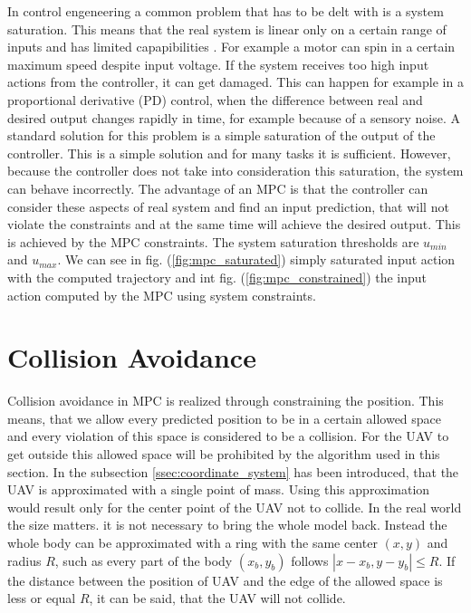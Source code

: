 \documentclass[a4paper,11pt,titlepage]{article}
\begin{document}
In control engeneering a common problem that has to be delt with is a system saturation. This means that the real system is linear only on a certain range of inputs and has limited capapibilities \cite{saturation}. For example a motor can spin in a certain maximum speed despite input voltage. If the system receives too high input actions from the controller, it can get damaged. This can happen for example in a proportional derivative (PD) control, when the difference between real and desired output changes rapidly in time, for example because of a sensory noise.
A standard  solution for this problem is a simple saturation of the output of the controller. This is a simple solution and for many tasks it is sufficient. However, because the controller does not take into consideration this saturation, the system can behave incorrectly.
The advantage of an MPC is that the controller can consider these aspects of real system and find an input prediction, that will not violate the constraints and at the same time will achieve the desired output. This is achieved by the MPC constraints. The system saturation thresholds are $u_{min}$ and $u_{max}$. We can see in fig. (\ref{fig:mpc_saturated}) simply saturated input action with the computed trajectory and int fig. (\ref{fig:mpc_constrained}) the input action computed by the MPC using system constraints. 

\section{Collision Avoidance}
Collision avoidance in MPC is realized through constraining the position. This means, that we allow every predicted position to be in a certain allowed space and every violation of this space is considered to be a collision. For the UAV to get outside this allowed space will be prohibited by the algorithm used in this section. In the subsection \ref{ssec:coordinate_system} has been introduced, that the UAV is approximated with a single point of mass. Using this approximation would result only for the center point of the UAV not to collide. In the real world the size matters. it is not necessary to bring the whole model back. Instead the whole body can be approximated with a ring with the same center $(x, y)$ and radius $R$, such as every part of the body $(x_b, y_b)$ follows $|x - x_b, y - y_b| \leq R$. If the distance between the position of UAV and the edge of the allowed space is less or equal $R$, it can be said, that the UAV will not collide. 
\end{document}
